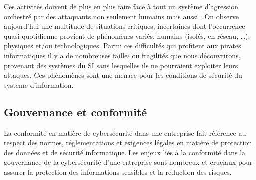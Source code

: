 Ces activités doivent de plus en plus faire face à tout un système d'agression orchestré par des attaquants non seulement humains mais aussi . On observe aujourd'hui une multitude de situations critiques, incertaines dont l'occurrence quasi quotidienne provient de phénomènes variés, humains (isolés, en réseau, …), physiques et/ou technologiques. Parmi ces difficultés qui profitent aux pirates informatiques il y a de nombreuses failles ou fragilités que nous découvrirons, provenant des systèmes du SI sans lesquelles ils ne pourraient exploiter leurs attaques. Ces phénomènes sont une menace pour les conditions de sécurité du système d'information.


\subsection{Gouvernance et conformité}

La conformité en matière de cybersécurité dans une entreprise fait référence au respect des normes, réglementations et exigences légales en matière de protection des données et de sécurité informatique. Les enjeux liés à la conformité dans la gouvernance de la cybersécurité d'une entreprise sont nombreux et cruciaux pour assurer la protection des informations sensibles et la réduction des risques.


